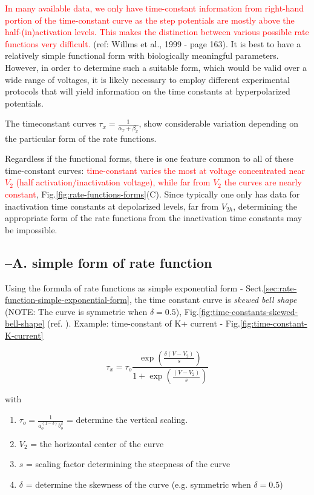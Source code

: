 \textcolor{red}{In many available data, we only have time-constant information
from right-hand portion of the time-constant curve as the step potentials are
mostly above the half-(in)activation levels. This makes the distinction between
various possible rate functions very difficult.} (ref: Willms et al., 1999 -
page 163).
It is best to have a relatively simple functional form with biologically
meaningful parameters. However, in order to determine such a suitable form,
which would be valid over a wide range of voltages, it is likely necessary to
employ different experimental protocols that will yield information on the time
constants at hyperpolarized potentials.


The timeconstant curves $\tau_x = \frac{1}{\alpha_x + \beta_x}$, show
considerable variation depending on the particular form of the rate functions.

Regardless if the functional forms, there is one feature common to all of these
time-constant curves: \textcolor{red}{time-constant varies the most at voltage
concentrated near $V_2$ (half activation/inactivation voltage), while far from
$V_2$ the curves are nearly constant}, Fig.\ref{fig:rate-functions-forms}(C).
Since typically one only has data for inactivation time constants at depolarized
levels, far from $V_{2h}$, determining the appropriate form of the rate
functions from the inactivation time constants may be impossible.



\subsection{--A. simple form of rate function}

Using the formula of rate functions as simple exponential form -
Sect.\ref{sec:rate-function-simple-exponential-form}, the time constant curve is
{\it skewed bell shape} (NOTE: The curve is symmetric when $\delta = 0.5$),
Fig.\ref{fig:time-constants-skewed-bell-shape} (ref. \citep{willms1999}).
Example:
time-constant of K+ current - Fig.\ref{fig:time-constant-K-current}

\begin{equation}
\label{eq:time-constant}
\tau_x = \tau_o \frac{ \exp\left( \frac{\delta (V - V_2)}{s} \right)}{1 +
\exp\left( \frac{(V-V_2)}{s}  \right)}
\end{equation}

with
\begin{enumerate}
  \item $\tau_o = \frac{1}{a_o^{(1-\delta)} b_o^{\delta}}$ = determine the
  vertical scaling.

  \item $V_2$ = the horizontal center of the curve

  \item $s$ = scaling factor determining the steepness of the curve

  \item $\delta$ = determine the skewness of the curve (e.g. symmetric when
  $\delta = 0.5$)

\end{enumerate}

